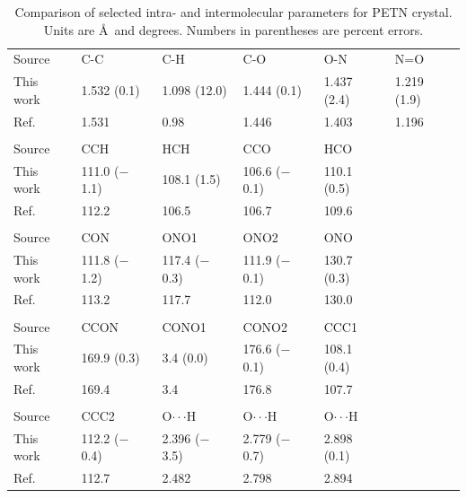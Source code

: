 \documentclass[prb,aps,nobibnotes,twocolumn,doublespace,twocolumngrid,superbib]{revtex4}
\begin{document}
\begin{table}[p]
\begin{center}
\begin{tabular}{llllll}
\hline\hline
Source & C-C & C-H & C-O & O-N & N=O  \\
This work & 1.532 (0.1) & 1.098 (12.0) & 1.444 (0.1) &  1.437 (2.4) & 1.219 (1.9) \\
Ref.\cite{Conant_1979} &  1.531   &   0.98  & 1.446  &  1.403 &   1.196 \\
\hline
\\
Source  &  CCH   &        HCH     &      CCO    &       HCO \\
This work & 111.0 ($-$1.1)  & 108.1  (1.5) &  106.6 ($-$0.1) & 110.1 (0.5) \\
Ref.\cite{Conant_1979} &  112.2    &  106.5  &  106.7   & 109.6 \\
\hline
\\
Source   &  CON     &       ONO1   &        ONO2     &      ONO \\
This work&  111.8 ($-$1.2) &  117.4 ($-$0.3)&  111.9 ($-$0.1)&  130.7 (0.3)\\
Ref.\cite{Conant_1979} &    113.2   &       117.7   &       112.0   &       130.0\\
\hline\\
Source &    CCON    &       CONO1   &       CONO2    &   CCC1\\
This work &  169.9 (0.3) &   3.4 (0.0) &     176.6 ($-$0.1) & 108.1 (0.4)\\
Ref.\cite{Conant_1979} &   169.4   &       3.4     &       176.8        & 107.7\\
\hline\\
Source &  CCC2 &  O$\cdot\cdot\cdot$H   &       O$\cdot\cdot\cdot$H   &       O$\cdot\cdot\cdot$H\\
This work &  112.2 ($-$0.4) & 2.396 ($-$3.5) &   2.779 ($-$0.7) & 2.898 (0.1)\\
Ref.\cite{Conant_1979} &   112.7 & 2.482   &       2.798   &       2.894\\
\hline\hline
\end{tabular}
\end{center}
\caption{Comparison of selected intra- and intermolecular parameters for
PETN crystal.  Units are \AA\ and degrees.  Numbers in parentheses
are percent errors.
}
\label{tab:table2}
\end{table}
\end{document}
